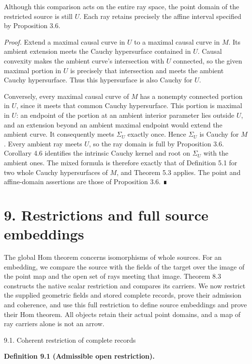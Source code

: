\documentclass[
  english,
  11pt,
  reqno]{amsart}
\makeatletter
\newcounter{none} %
\newcommand{\paperstatementsection}{\@startsection{subsection}{2}%
  \z@{.5\linespacing\@plus.7\linespacing}{.35\baselineskip}%
  {\normalfont\bfseries}}
\newcommand{\paperfirststatement}[1]{%
  {\normalfont\bfseries #1\par}%
  \nobreak\@afterindenttrue\@afterheading}
\makeatother
\begin{document}
Although this comparison acts on the entire ray space, the point domain
of the restricted source is still \(U\). Each ray retains precisely the
affine interval specified by Proposition 3.6.

\emph{Proof.} Extend a maximal causal curve in \(U\) to a maximal causal
curve in \(M\). Its ambient extension meets the Cauchy hypersurface
contained in \(U\). Causal convexity makes the ambient curve's
intersection with \(U\) connected, so the given maximal portion in \(U\)
is precisely that intersection and meets the ambient Cauchy
hypersurface. Thus this hypersurface is also Cauchy for \(U\).

Conversely, every maximal causal curve of \(M\) has a nonempty connected
portion in \(U\), since it meets that common Cauchy hypersurface. This
portion is maximal in \(U\): an endpoint of the portion at an ambient
interior parameter lies outside \(U\), and an extension beyond an
ambient maximal endpoint would extend the ambient curve. It consequently
meets \(\Sigma_U\) exactly once. Hence \(\Sigma_U\) is Cauchy for \(M\).
Every ambient ray meets \(U\), so the ray domain is full by Proposition
3.6. Corollary 4.6 identifies the intrinsic Cauchy kernel and root on
\(\Sigma_U\) with the ambient ones. The mixed formula is therefore
exactly that of Definition 5.1 for two whole Cauchy hypersurfaces of
\(M\), and Theorem 5.3 applies. The point and affine-domain assertions
are those of Proposition 3.6. ∎

\protect{}\label{sec:global-source-open-embeddings}

\section{9. Restrictions and full source
embeddings}\label{restrictions-and-full-source-embeddings}

The global Hom theorem concerns isomorphisms of whole sources. For an
embedding, we compare the source with the fields of the target over the
image of the point map and the open set of rays meeting that image.
Theorem 8.3 constructs the native scalar restriction and compares its
carriers. We now restrict the supplied geometric fields and stored
complete records, prove their admission and coherence, and use this full
restriction to define source embeddings and prove their Hom theorem. All
objects retain their actual point domains, and a map of ray carriers
alone is not an arrow.

\protect{}\label{sec:global-source-restriction-coherence}
\paperstatementsection{9.1. Coherent restriction of complete
records}\label{coherent-restriction-of-complete-records}
\paperfirststatement{\protect{}\label{def:global-admissible-source-open}Definition 9.1 (Admissible open restriction).}
\end{document}

